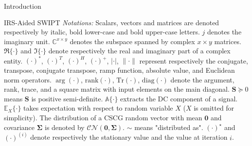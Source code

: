 \documentclass[journal]{IEEEtran}
\begin{document}
\begin{section}{Introduction}
\begin{subsection}{IRS-Aided SWIPT}
			\emph{Notations:} Scalars, vectors and matrices are denoted respectively by italic, bold lower-case and bold upper-case letters. $j$ denotes the imaginary unit. $\mathbb{C}^{x \times y}$ denotes the subspace spanned by complex $x \times y$ matrices. $\Re\{\cdot\}$ and $\Im\{\cdot\}$ denote respectively the real and imaginary part of a complex entity. $(\cdot)^*$, $(\cdot)^T$, $(\cdot)^H$, $(\cdot)^+$, $\lvert{\cdot}\rvert$, $\lVert{\cdot}\rVert$ represent respectively the conjugate, transpose, conjugate transpose, ramp function, absolute value, and Euclidean norm operators. $\arg(\cdot)$, $\mathrm{rank}(\cdot)$, $\mathrm{Tr}(\cdot)$, $\mathrm{diag}(\cdot)$ denote the argument, rank, trace, and a square matrix with input elements on the main diagonal. $\boldsymbol{S} \succeq 0$ means $\boldsymbol{S}$ is positive semi-definite. $\mathbb{A}\{\cdot\}$ extracts the DC component of a signal. $\mathbb{E}_X\{\cdot\}$ takes expectation with respect to random variable $X$ ($X$ is omitted for simplicity). The distribution of a CSCG random vector with mean $\boldsymbol{0}$ and covariance $\boldsymbol{\Sigma}$ is denoted by $\mathcal{CN}(\boldsymbol{0},\boldsymbol{\Sigma})$. $\sim$ means "distributed as". $(\cdot)^{\star}$ and $(\cdot)^{(i)}$ denote respectively the stationary value and the value at iteration $i$.
		\end{subsection}
	\end{section}
\end{document}
